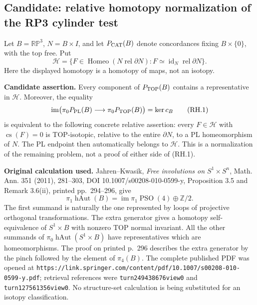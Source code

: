 \subsection*{Candidate: relative homotopy normalization of the RP3 cylinder test}

Let $B=\mathbb{RP}^3$, $N=B\times I$, and let $P_{\rm CAT}(B)$
denote concordances fixing $B\times\{0\}$, with the top free.
Put
\[
 \mathcal H=\{F\in\operatorname{Homeo}(N\operatorname{ rel}\partial N):
       F\simeq\operatorname{id}_N\operatorname{ rel}\partial N\}.
\]
Here the displayed homotopy is a homotopy of maps, not an isotopy.

\textbf{Candidate assertion.}\quad
Every component of $P_{\rm TOP}(B)$ contains a representative in
$\mathcal H$. Moreover, the equality
\[
 \operatorname{im}\bigl(\pi_0P_{\rm PL}(B)\longrightarrow
                  \pi_0P_{\rm TOP}(B)\bigr)=\ker c_B
 \tag{RH.1}
\]
is equivalent to the following concrete relative assertion:
every $F\in\mathcal H$ with $\operatorname{cs}(F)=0$ is TOP-isotopic,
relative to the entire $\partial N$, to a PL homeomorphism of $N$.
The PL endpoint then automatically belongs to $\mathcal H$.
This is a normalization of the remaining problem, not a proof of
either side of (RH.1).

\textbf{Original calculation used.}\quad
Jahren--Kwasik, \emph{Free involutions on $S^1\times S^n$},
Math. Ann. 351 (2011), 281--303, DOI 10.1007/s00208-010-0599-y,
Proposition 3.5 and Remark 3.6(ii), printed pp.~294--296, give
\[
 \pi_1\operatorname{hAut}(B)
   =\operatorname{im}\pi_1\operatorname{PSO}(4)\oplus\mathbb Z/2.
 \tag{RH.2}
\]
The first summand is naturally the one represented by loops of
projective orthogonal transformations. The extra generator gives a
homotopy self-equivalence of $S^1\times B$ with nonzero TOP normal
invariant. All the other summands of
$\pi_0\operatorname{hAut}(S^1\times B)$ have representatives which
are homeomorphisms. The proof on printed p.~296 describes the extra
generator by the pinch followed by the element of $\pi_4(B)$.
The complete published PDF was opened at
\texttt{https://link.springer.com/content/pdf/10.1007/s00208-010-0599-y.pdf};
retrieval references were \texttt{turn249438676view0} and
\texttt{turn127561356view0}. No structure-set calculation is being
substituted for an isotopy classification.

